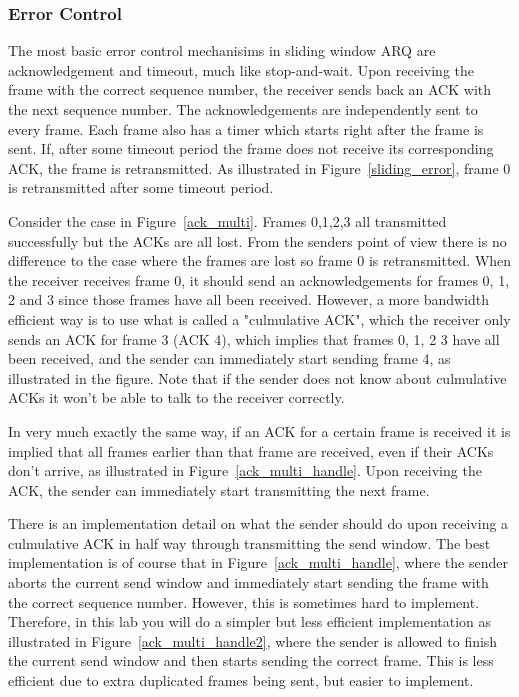 \documentclass[11pt]{article}
\begin{document}
\subsubsection{Error Control}
The most basic error control mechanisims in sliding window ARQ are acknowledgement and timeout, much like stop-and-wait.
Upon receiving the frame with the correct sequence number, the receiver sends back an ACK with the next sequence number.
The acknowledgements are independently sent to every frame.
Each frame also has a timer which starts right after the frame is sent.
If, after some timeout period the frame does not receive its corresponding ACK, the frame is retransmitted.
As illustrated in Figure~\ref{sliding_error}, frame 0 is retransmitted after some timeout period.

Consider the case in Figure~\ref{ack_multi}. Frames 0,1,2,3 all transmitted successfully but the ACKs are all lost.
From the senders point of view there is no difference to the case where the frames are lost so frame 0 is retransmitted.
When the receiver receives frame 0, it should send an acknowledgements for frames 0, 1, 2 and 3 since those frames have all been received.
However, a more bandwidth efficient way is to use what is called a "culmulative ACK", which the receiver only sends an ACK for frame 3 (ACK 4), which implies that frames 0, 1, 2 3 have all been received, and the sender can immediately start sending frame 4, as illustrated in the figure.
Note that if the sender does not know about culmulative ACKs it won't be able to talk to the receiver correctly.

In very much exactly the same way, if an ACK for a certain frame is received it is implied that all frames earlier than that frame are received, even if their ACKs don't arrive, as illustrated in Figure~\ref{ack_multi_handle}.
Upon receiving the ACK, the sender can immediately start transmitting the next frame.

There is an implementation detail on what the sender should do upon receiving a culmulative ACK in half way through transmitting the send window.
The best implementation is of course that in Figure~\ref{ack_multi_handle}, where the sender aborts the current send window and immediately start sending the frame with the correct sequence number.
However, this is sometimes hard to implement. Therefore, in this lab you will do a simpler but less efficient implementation as illustrated in Figure~\ref{ack_multi_handle2}, where the sender is allowed to finish the current send window and then starts sending the correct frame.
This is less efficient due to extra duplicated frames being sent, but easier to implement.
\end{document}
